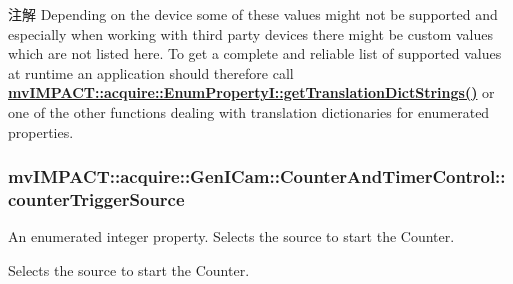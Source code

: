 \begin{DoxyNote}{注解}
Depending on the device some of these values might not be supported and especially when working with third party devices there might be custom values which are not listed here. To get a complete and reliable list of supported values at runtime an application should therefore call {\bfseries \hyperlink{classmv_i_m_p_a_c_t_1_1acquire_1_1_enum_property_i_a0ba6ccbf5ee69784d5d0b537924d26b6}{mv\+I\+M\+P\+A\+C\+T\+::acquire\+::\+Enum\+Property\+I\+::get\+Translation\+Dict\+Strings()}} or one of the other functions dealing with translation dictionaries for enumerated properties. 
\end{DoxyNote}
\hypertarget{classmv_i_m_p_a_c_t_1_1acquire_1_1_gen_i_cam_1_1_counter_and_timer_control_a794668b6daf40a909de1d84fa1408859}{
\subsubsection[{counter\+Trigger\+Source}]{ mv\+I\+M\+P\+A\+C\+T\+::acquire\+::\+Gen\+I\+Cam\+::\+Counter\+And\+Timer\+Control\+::counter\+Trigger\+Source}}\label{classmv_i_m_p_a_c_t_1_1acquire_1_1_gen_i_cam_1_1_counter_and_timer_control_a794668b6daf40a909de1d84fa1408859}


An enumerated integer property. Selects the source to start the Counter. 

Selects the source to start the Counter.

